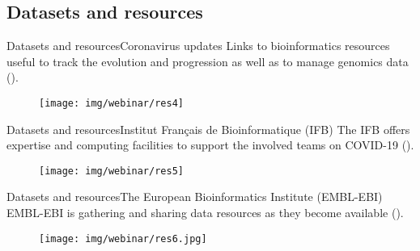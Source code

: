 \documentclass[10pt]{beamer}
\newcommand{\1}{
        	\setbeamertemplate{background}{
        		\texttt{[image: img/1]}
        		\tikz[overlay] \fill[fill opacity=0.75,fill=white] (0,0) rectangle (-\paperwidth,\paperheight);
        	}
}
\begin{document}
\subsection{Datasets and resources}

\begin{frame}{Datasets and resources}{Coronavirus updates}
	Links to bioinformatics resources useful to track the evolution and progression as well as to manage genomics data (\href{http://www.clinbioinfosspa.es/CovidResources}{}).
	\begin{figure}[]
		\centering
		\texttt{[image: img/webinar/res4]}				
	\end{figure}	
\end{frame}


\begin{frame}{Datasets and resources}{Institut Français de Bioinformatique (IFB)}
	The IFB offers expertise and computing facilities to support the involved teams on COVID-19 (\href{https://www.france-bioinformatique.fr/en/action-covid-19}{}).
	\begin{figure}[]
		\centering
		\texttt{[image: img/webinar/res5]}				
	\end{figure}	
\end{frame}

\begin{frame}{Datasets and resources}{The European Bioinformatics Institute (EMBL-EBI)}
	EMBL-EBI is gathering and sharing data resources as they become available (\href{https://www.ebi.ac.uk/about/news/announcements/coronavirus-data}{}).
	\begin{figure}[]
		\centering
		\texttt{[image: img/webinar/res6.jpg]}				
	\end{figure}	
\end{frame}
\end{document}
